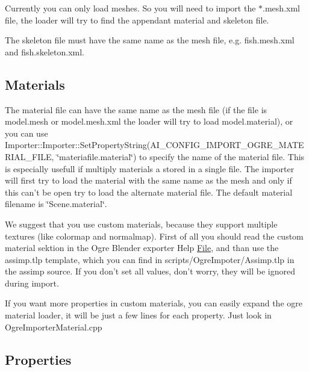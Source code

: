 Currently you can only load meshes. So you will need to import the $\ast$.mesh.\+xml file, the loader will try to find the appendant material and skeleton file.

The skeleton file must have the same name as the mesh file, e.\+g. fish.\+mesh.\+xml and fish.\+skeleton.\+xml.\hypertarget{importer_notes_material}{}\subsection{Materials}\label{importer_notes_material}
The material file can have the same name as the mesh file (if the file is model.\+mesh or model.\+mesh.\+xml the loader will try to load model.\+material), or you can use Importer\+::\+Importer\+::\+Set\+Property\+String(A\+I\+\_\+\+C\+O\+N\+F\+I\+G\+\_\+\+I\+M\+P\+O\+R\+T\+\_\+\+O\+G\+R\+E\+\_\+\+M\+A\+T\+E\+R\+I\+A\+L\+\_\+\+F\+I\+L\+E, \char`\"{}materiafile.\+material\char`\"{}) to specify the name of the material file. This is especially usefull if multiply materials a stored in a single file. The importer will first try to load the material with the same name as the mesh and only if this can't be open try to load the alternate material file. The default material filename is \char`\"{}\+Scene.\+material\char`\"{}.

We suggest that you use custom materials, because they support multiple textures (like colormap and normalmap). First of all you should read the custom material sektion in the Ogre Blender exporter Help \hyperlink{class_file}{File}, and than use the assimp.\+tlp template, which you can find in scripts/\+Ogre\+Impoter/\+Assimp.\+tlp in the assimp source. If you don't set all values, don't worry, they will be ignored during import.

If you want more properties in custom materials, you can easily expand the ogre material loader, it will be just a few lines for each property. Just look in Ogre\+Importer\+Material.\+cpp\hypertarget{importer_notes_Importer}{}\subsection{Properties}\label{importer_notes_Importer}

